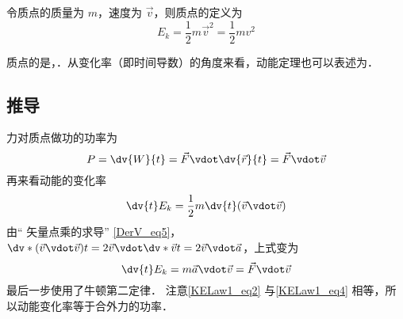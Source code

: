 

令质点的质量为 $m$，速度为 $\vec v$，则质点的定义为
\begin{equation}
E_k = \frac12 m\vec v^2 = \frac12 mv^2
\end{equation}

质点的是，．从变化率（即时间导数）的角度来看，动能定理也可以表述为．

\subsection{推导}
力对质点做功的功率为
\begin{equation}\label{KELaw1_eq2}
P = \dv{W}{t} =  \vec F\vdot \dv{\vec r}{t} = \vec F\vdot\vec v
\end{equation}
再来看动能的变化率
\begin{equation}
\dv{t} E_k = \frac12 m\dv{t} (\vec v\vdot\vec v)
\end{equation}
由“ 矢量点乘的求导” \autoref{DerV_eq5}，$\dv*{(\vec v\vdot\vec v)}{t} = 2\vec v\vdot \dv*{\vec v}{t} = 2\vec v\vdot\vec a$，上式变为
\begin{equation}\label{KELaw1_eq4}
\dv{t} E_k = m\vec a\vdot\vec v = \vec F\vdot\vec v
\end{equation}
最后一步使用了牛顿第二定律．%
注意\autoref{KELaw1_eq2} 与\autoref{KELaw1_eq4} 相等，所以动能变化率等于合外力的功率．